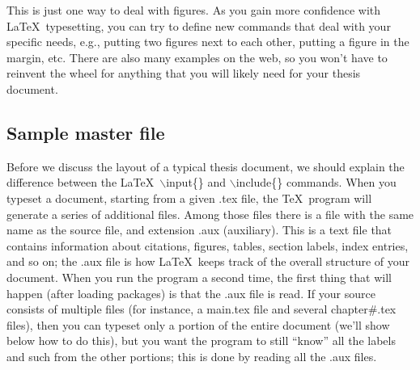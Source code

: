 \documentclass[DIV=calc, paper=letter, fontsize=11pt]{scrartcl}	 %
\newcommand{\la}[2]{\textsf{$\backslash$#1}\{#2\}}
\begin{document}
This is just one way to deal with figures.  As you gain more confidence with \LaTeX\ typesetting, you can try to define
new commands that deal with your specific needs, e.g., putting two figures next to each other, putting a figure in the 
margin, etc.  There are also many examples on the web, so you won't have to reinvent the wheel for anything that you
will likely need for your thesis document.





\subsection{Sample master file\label{sec:sample}}
Before we discuss the layout of a typical thesis document, we should explain the difference between the \LaTeX\ \la{input}{}
and \la{include}{} commands.  When you typeset a document, starting from a given .tex file, the \TeX\ program will generate
a series of additional files.  Among those files there is a file with the same name as the source file, and extension .aux (auxiliary).
This is a text file that contains information about citations, figures, tables, section labels, index entries, and so on; the .aux file is how \LaTeX\
keeps track of the overall structure of your document.  When you run the program a second time, the first thing that will happen (after loading
packages) is that the .aux file is read.  If your source consists of multiple files (for instance, a \textsf{main.tex} file and several \textsf{chapter\#.tex}
files), then you can typeset only a portion of the entire document (we'll show below how to do this), but you want the program to still
``know'' all the labels and such from the other portions; this is done by reading all the .aux files.
\end{document}
